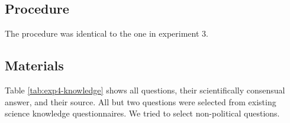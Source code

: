 \documentclass[
  doc,floatsintext]{apa6}
\begin{document}
\subsection{Procedure}\label{procedure-3}

The procedure was identical to the one in experiment 3.

\subsection{Materials}\label{materials-4}

\FloatBarrier

Table \ref{tab:exp4-knowledge} shows all questions, their scientifically consensual answer, and their source. All but two questions were selected from existing science knowledge questionnaires. We tried to select non-political questions.

\begingroup\fontsize{8}{10}\selectfont
\end{document}
